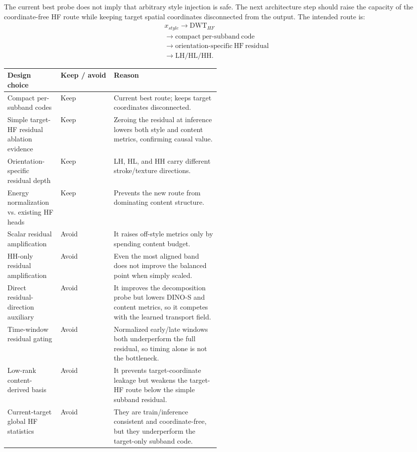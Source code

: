 \documentclass[10pt,twocolumn]{article}
\begin{document}
The current best probe does not imply that arbitrary style injection is safe. The next
architecture step should raise the capacity of the coordinate-free HF route while keeping
target spatial coordinates disconnected from the output. The intended route is:
\[
  \begin{array}{l}
  x_{style}\rightarrow \mathrm{DWT}_{HF}\\
  \rightarrow\mathrm{compact\ per\mbox{-}subband\ code}\\
  \rightarrow\mathrm{orientation\mbox{-}specific\ HF\ residual}\\
  \rightarrow\mathrm{LH/HL/HH}.
  \end{array}
\]

\begin{center}
\footnotesize
\begin{tabularx}{\linewidth}{p{0.25\linewidth}p{0.25\linewidth}X}
\toprule
Design choice & Keep / avoid & Reason \\
\midrule
Compact per-subband codes & Keep & Current best route; keeps target coordinates disconnected. \\
Simple target-HF residual ablation evidence & Keep & Zeroing the residual at inference lowers both style and content metrics, confirming causal value. \\
Orientation-specific residual depth & Keep & LH, HL, and HH carry different stroke/texture directions. \\
Energy normalization vs. existing HF heads & Keep & Prevents the new route from dominating content structure. \\
Scalar residual amplification & Avoid & It raises off-style metrics only by spending content budget. \\
HH-only residual amplification & Avoid & Even the most aligned band does not improve the balanced point when simply scaled. \\
Direct residual-direction auxiliary & Avoid & It improves the decomposition probe but lowers DINO-S and content metrics, so it competes with the learned transport field. \\
Time-window residual gating & Avoid & Normalized early/late windows both underperform the full residual, so timing alone is not the bottleneck. \\
Low-rank content-derived basis & Avoid & It prevents target-coordinate leakage but weakens the target-HF route below the simple subband residual. \\
Current-target global HF statistics & Avoid & They are train/inference consistent and coordinate-free, but they underperform the target-only subband code. \\

\end{tabularx}
\end{center}
\end{document}
